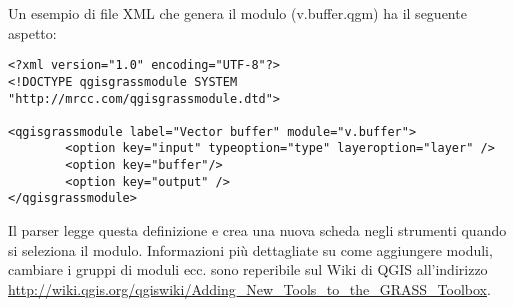 Un esempio di file XML che genera il modulo  (v.buffer.qgm)
ha il seguente aspetto:

\begin{verbatim}
<?xml version="1.0" encoding="UTF-8"?>
<!DOCTYPE qgisgrassmodule SYSTEM "http://mrcc.com/qgisgrassmodule.dtd">

<qgisgrassmodule label="Vector buffer" module="v.buffer">
        <option key="input" typeoption="type" layeroption="layer" />
        <option key="buffer"/>
        <option key="output" />
</qgisgrassmodule>
\end{verbatim}

Il parser legge questa definizione e crea una nuova scheda negli strumenti
quando si seleziona il modulo. Informazioni più dettagliate su come aggiungere
moduli, cambiare i gruppi di moduli ecc. sono reperibile sul Wiki di QGIS
all'indirizzo \\
\url{http://wiki.qgis.org/qgiswiki/Adding\_New\_Tools\_to\_the\_GRASS\_Toolbox}.

